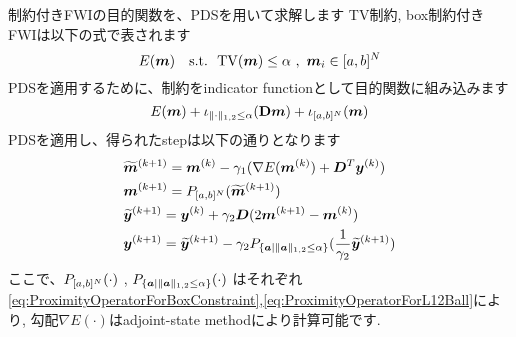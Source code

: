 制約付きFWIの目的関数を、PDSを用いて求解します
TV制約, box制約付きFWIは以下の式で表されます
\begin{equation} \label{eq:FWIObjectiveWithTVConstraint} \FWIObjectiveWithTVConstraint \end{equation}
PDSを適用するために、制約をindicator functionとして目的関数に組み込みます
\begin{equation} \label{eq:FWIObjectiveWithTVConstraintWithIndicatorFunction} \FWIObjectiveWithTVConstraintWithIndicatorFunction \end{equation}
PDSを適用し、得られたstepは以下の通りとなります
\begin{equation} \label{eq:FWIWithPDS} \FWIWithPDS \notag \end{equation}
ここで、$\projBox{\cdot}$ , $\projLOneTwoBall{\cdot}$ はそれぞれ\eqref{eq:ProximityOperatorForBoxConstraint},\eqref{eq:ProximityOperatorForL12Ball}により,
勾配${\nabla E(\cdot)}$はadjoint-state method\cite{FWI-gradient}により計算可能です.
